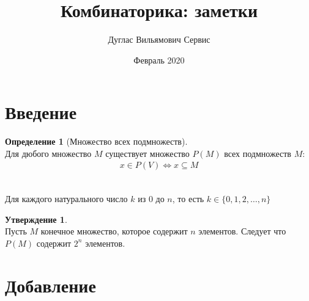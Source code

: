 \documentclass[fleqn,11pt]{article}
\theoremstyle{definition}
\newtheorem{definition}{Определение}
\newtheorem{proposition}{Утверждение}
\newenvironment{myproof}[1][\proofname]{%
  \proof[\rm \bf #1]%
}{\endproof}
\begin{document}
\title{Комбинаторика: заметки}
\author{Дуглас Вильямович Сервис}
\date{Февраль 2020}
\maketitle

\section{Введение}

\begin{definition}[Множество всех подмножеств] ~\\
  Для дюбого множество $M$ существует множество $P(M)$ всех подмножеств $M$:
  \begin{align*}
    x \in P(V) \iff x \subseteq M
  \end{align*}
\end{definition}

\begin{myproof} ~\\
  Для каждого натурального число $k$ из $0$ до $n$, то есть $k \in \{0, 1, 2, \ldots ,n\}$
\end{myproof}

\begin{proposition} ~\\
  Пусть $M$ конечное множество, которое содержит $n$ элементов. Следует что $P(M)$
  содержит $2^n$ элементов.
\end{proposition}


\printbibliography

\clearpage

\section{Добавление}
\end{document}
